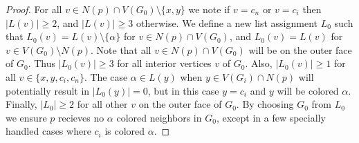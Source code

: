 \documentclass[11pt,letter]{article}
\begin{document}
\begin{proof}
\noindent For all $v\in N(p)\cap V(G_0)\setminus\{x,y\}$ we note if $v=c_n$ or $v=c_i$
then $|L(v)|\ge 2$, and $|L(v)|\ge3$ otherwise. We define a new list assignment $L_0$
such that $L_0(v)=L(v)\setminus\{\alpha\}$ for
$v\in N(p)\cap V(G_0)$, and $L_0(v)=L(v)$ for $v\in V(G_0)\setminus N(p)$. Note that all
$v\in N(p)\cap V(G_0)$ will be on the outer face of $G_0$. Thus $|L_0(v)|\ge 3$ for all interior
vertices $v$ of $G_0$. Also, $|L_0(v)|\ge 1$ for all $v\in\{x,y,c_i,c_n\}$. The case $\alpha\in L(y)$ when
$y\in V(G_i)\cap N(p)$ will potentially result in $|L_0(y)|=0$, but in this case $y=c_i$ and $y$ will be
colored $\alpha$. Finally, $|L_0|\ge2$ for all other $v$ on the outer face of $G_0$. By choosing $G_0$ from
$L_0$ we ensure $p$ recieves no $\alpha$ colored neighbors in $G_0$, except in a few specially handled cases
where $c_i$ is colored $\alpha$.


\end{proof}
\end{document}
